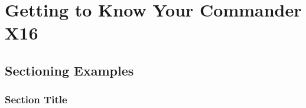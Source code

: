 \documentclass[
	11pt, %
	fleqn, %
	letterpaper, %
]{CommodoreBlueBook}
\begin{document}
\cleardoublepage %


\pagestyle{empty} %

\setcounter{tocdepth}{1}
\tableofcontents %

\listoffigures %

\listoftables %

\pagestyle{fancy} %

\cleardoublepage %


\part{Getting to Know Your Commander X16}


\chapterspaceabove{6.75cm} %
\chapterspacebelow{7.25cm} %


\chapter{Sectioning Examples}

\section{Section Title}
\end{document}
